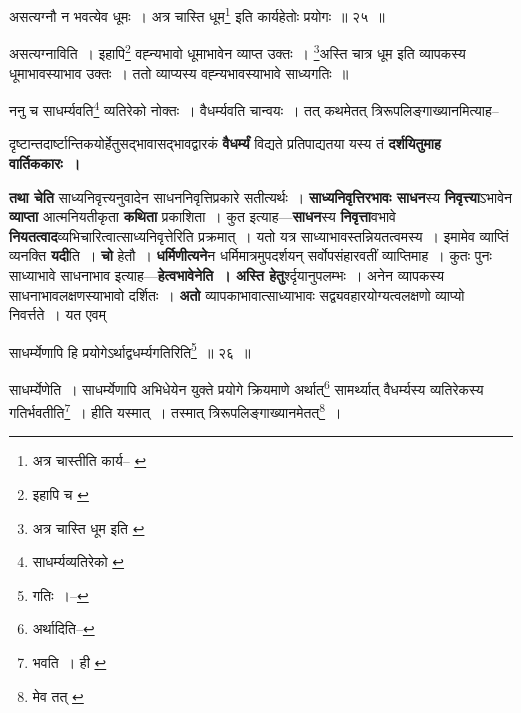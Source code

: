 \documentclass[article,12pt,a4paper]{memoir}
\begin{document}
	  \bigskip
	  \begingroup
	

	  \pstart असत्यग्नौ न भवत्येव धूमः । अत्र चास्ति धूम\footnote{अत्र चास्तीति कार्य--\cite{dp-msC} \cite{dp-msD}} इति कार्यहेतोः प्रयोगः ॥ २५ ॥
	\pend
      
	  \endgroup
	 

	  \pstart असत्यग्नाविति । इहापि\footnote{इहापि च \cite{dp-msC} \cite{dp-msD}} वह्न्यभावो धूमाभावेन व्याप्त उक्तः । \footnote{अत्र चास्ति धूम इति \cite{dp-msC} \cite{dp-msD}}अस्ति चात्र धूम इति व्यापकस्य धूमाभावस्याभाव उक्तः । ततो व्याप्यस्य वह्न्यभावस्याभावे साध्यगतिः ॥
	\pend
       

	  \pstart ननु च साधर्म्यवति\footnote{साधर्म्यव्यतिरेको \cite{dp-msB}} व्यतिरेको नोक्तः । वैधर्म्यवति चान्वयः । तत् कथमेतत् त्रिरूपलिङ्गाख्यानमित्याह--
	\pend
      
	  \endgroup
	

	  \pstart दृष्टान्तदार्ष्टान्तिकयोर्हेतुसद्भावासद्भावद्वारकं \textbf{वैधर्म्यं} विद्यते प्रतिपाद्यतया यस्य तं \textbf{दर्शयितुमाह वार्तिककारः ।}
	\pend
      

	  \pstart \textbf{तथा चेति} साध्यनिवृत्त्यनुवादेन साधननिवृत्तिप्रकारे सतीत्यर्थः । \textbf{साध्यनिवृत्तिरभावः साधन}स्य \textbf{निवृत्त्या}ऽभावेन \textbf{व्याप्ता} आत्मनियतीकृता \textbf{कथिता} प्रकाशिता । कुत इत्याह—\textbf{साधन}स्य \textbf{निवृत्ता}वभावे \textbf{नियतत्वाद}व्यभिचारित्वात्साध्यनिवृत्तेरिति प्रक्रमात् । यतो यत्र साध्याभावस्तन्नियतत्वमस्य । इमामेव व्याप्तिं व्यनक्ति \textbf{यदी}ति । \textbf{चो} हेतौ । \textbf{धर्मिणीत्यने}न धर्मिमात्रमुपदर्शयन् सर्वोपसंहारवतीं व्याप्तिमाह । कुतः पुनः साध्याभावे साधनाभाव इत्याह—\textbf{हेत्वभावेनेति । अस्ति हेतु}र्श्दृयानुपलम्भः । अनेन व्यापकस्य साधनाभावलक्षणस्याभावो दर्शितः । \textbf{अतो} व्यापकाभावात्साध्याभावः सद्व्यवहारयोग्यत्वलक्षणो व्याप्यो निवर्त्तते । यत एवम्
	\pend
      \leavevmode{}
	  \bigskip
	  \begingroup
	
	  \bigskip
	  \begingroup
	

	  \pstart साधर्म्येणापि हि प्रयोगेऽर्थाद्वधर्म्यगतिरिति\footnote{गतिः ।--\cite{dp-msC}} ॥ २६ ॥
	\pend
      
	  \endgroup
	 

	  \pstart साधर्म्येणेति । साधर्म्येणापि अभिधेयेन युक्ते प्रयोगे क्रियमाणे अर्थात्\footnote{अर्थादिति--\cite{dp-msC}} सामर्थ्यात् वैधर्म्यस्य व्यतिरेकस्य गतिर्भवतीति\footnote{भवति । ही \cite{dp-msB} \cite{dp-msC} \cite{dp-msD}} । हीति यस्मात् । तस्मात् त्रिरूपलिङ्गाख्यानमेतत्\footnote{मेव तत् \cite{dp-msC}} ।
	\pend
       
\end{document}

